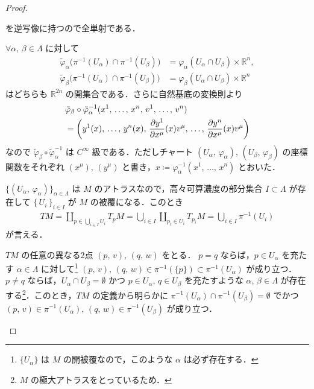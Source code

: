 \documentclass[geometry_main]{subfiles}
\begin{document}
\begin{proof}
\begin{description}
        を逆写像に持つので全単射である．
        \item[\textbf{(DS-2, 3)}] $\forall \alpha,\, \beta \in \Lambda$ に対して
        \begin{align}
            \tilde{\varphi}_\alpha \bigl( \pi^{-1}(U_\alpha) \cap \pi^{-1}(U_\beta) \bigr) &= \varphi_\alpha (U_\alpha \cap U_\beta) \times \mathbb{R}^n, \\
            \tilde{\varphi}_\beta \bigl( \pi^{-1}(U_\alpha) \cap \pi^{-1}(U_\beta) \bigr) &= \varphi_\beta (U_\alpha \cap U_\beta) \times \mathbb{R}^n
        \end{align}
        はどちらも $\mathbb{R}^{2n}$ の開集合である．さらに自然基底の変換則より
        \begin{align}
            &\tilde{\varphi}_\beta \circ \tilde{\varphi}_\alpha^{-1} (x^1,\, \dots,\, x^n,\, v^1,\, \dots,\, v^n) \\
            &= \left( y^1(x),\, \dots,\, y^n (x),\, \pdv{y^1}{x^\mu}()(x) v^\mu,\, \dots,\, \pdv{y^n}{x^\mu}()(x) v^\mu \right) 
        \end{align}
        なので $\tilde{\varphi}_\beta \circ \tilde{\varphi}_\alpha^{-1} $ は $C^\infty$ 級である．ただしチャート $(U_\alpha,\, \varphi_\alpha),\, (U_\beta,\,\varphi_\beta)$ の座標関数をそれぞれ $(x^\mu),\, (y^\mu)$ と書き，$x \coloneqq\varphi_\alpha^{-1}(x^1,\, \dots,\, x^n)$ とおいた．
        \item[\textbf{(DS-4)}] $\{(U_\alpha,\, \varphi_\alpha)\}_{\alpha \in \Lambda}$ は $M$ のアトラスなので，高々可算濃度の部分集合 $I \subset \Lambda$ が存在して $\{\, U_i\,\}_{i \in I}$ が $M$ の被覆になる．このとき
        \begin{align}
            TM = \coprod_{p \in \bigcup_{i \in I} U_i} T_p M = \bigcup_{i \in I} \coprod_{p_i \in U_i} T_{p_i} M = \bigcup_{i \in I} \pi^{-1} (U_i)
        \end{align}
        が言える．
        \item[\textbf{(DS-5)}] $TM$ の任意の異なる2点 $(p,\, v),\, (q,\, w)$ をとる．
        $p = q$ ならば，$p \in U_\alpha$ を充たす $\alpha \in \Lambda$ に対して\footnote{$\{U_\alpha\}$ は $M$ の開被覆なので，このような $\alpha$ は必ず存在する．} $(p,\, v),\, (q,\,w) \in \pi^{-1} (\{p\}) \subset \pi^{-1}(U_\alpha)$ が成り立つ．
        $p \neq q$ ならば，$U_\alpha \cap U_\beta =\emptyset$ かつ $p \in U_\alpha,\, q \in U_\beta$ を充たすような $\alpha,\, \beta \in \Lambda$ が存在する\footnote{$M$ の極大アトラスをとっているため．}．このとき，$TM$ の定義から明らかに $\pi^{-1} (U_\alpha) \cap \pi^{-1}(U_\beta) = \emptyset$ でかつ $(p,\, v) \in \pi^{-1}(U_\alpha),\, (q,\, w) \in \pi^{-1}(U_\beta)$ が成り立つ．
    \end{description}
    

\end{proof}
\end{document}
